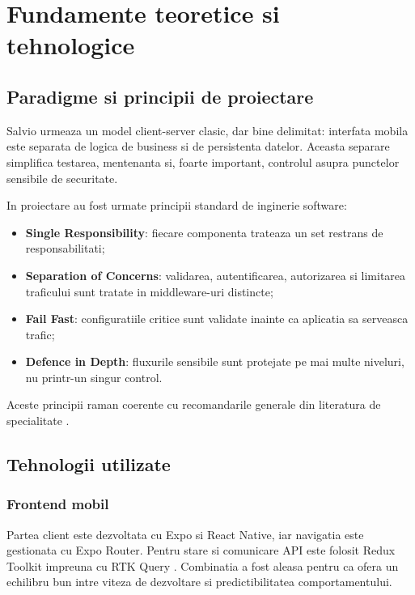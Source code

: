 \chapter{Fundamente teoretice si tehnologice}

\section{Paradigme si principii de proiectare}

Salvio urmeaza un model client-server clasic, dar bine delimitat: interfata mobila este separata de logica de business si de persistenta datelor. Aceasta separare simplifica testarea, mentenanta si, foarte important, controlul asupra punctelor sensibile de securitate.

In proiectare au fost urmate principii standard de inginerie software:
\begin{itemize}[leftmargin=1.2cm]
    \item \textbf{Single Responsibility}: fiecare componenta trateaza un set restrans de responsabilitati;
    \item \textbf{Separation of Concerns}: validarea, autentificarea, autorizarea si limitarea traficului sunt tratate in middleware-uri distincte;
    \item \textbf{Fail Fast}: configuratiile critice sunt validate inainte ca aplicatia sa serveasca trafic;
    \item \textbf{Defence in Depth}: fluxurile sensibile sunt protejate pe mai multe niveluri, nu printr-un singur control.
\end{itemize}

Aceste principii raman coerente cu recomandarile generale din literatura de specialitate \parencite{pressman2014software}.

\section{Tehnologii utilizate}

\subsection{Frontend mobil}

Partea client este dezvoltata cu Expo si React Native, iar navigatia este gestionata cu Expo Router. Pentru stare si comunicare API este folosit Redux Toolkit impreuna cu RTK Query \parencite{reduxdocs}. Combinatia a fost aleasa pentru ca ofera un echilibru bun intre viteza de dezvoltare si predictibilitatea comportamentului.

